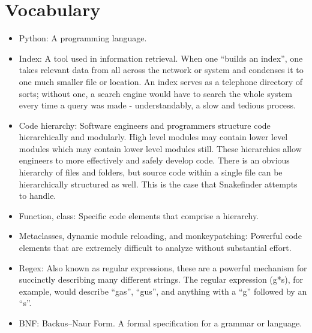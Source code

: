 \documentclass{article}
\begin{document}
\section{Vocabulary}
\begin{itemize}
	\item Python: A programming language.

	\item Index: A tool used in information retrieval. When one ``builds an index'', one takes relevant data from all across the network or system and condenses it to one much smaller file or location. An index serves as a telephone directory of sorts; without one, a search engine would have to search the whole system every time a query was made - understandably, a slow and tedious process.

	\item Code hierarchy: Software engineers and programmers structure code hierarchically and modularly. High level modules may contain lower level modules which may contain lower level modules still. These hierarchies allow engineers to more effectively and safely develop code. There is an obvious hierarchy of files and folders, but source code within a single file can be hierarchically structured as well. This is the case that Snakefinder attempts to handle.

	\item Function, class: Specific code elements that comprise a hierarchy.
	\item Metaclasses, dynamic module reloading, and monkeypatching: Powerful code elements that are extremely difficult to analyze without substantial effort.
	\item Regex: Also known as regular expressions, these are a powerful mechanism for succinctly describing many different strings. The regular expression (g*s), for example, would describe ``gas'', ``gus'', and anything with a ``g'' followed by an ``s''.

	\item BNF: Backus$–$Naur Form. A formal specification for a grammar or language.
\end{itemize}


\end{document}
